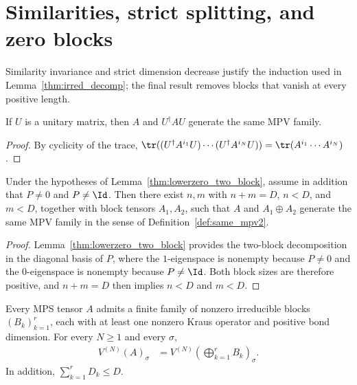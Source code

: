 \section{Similarities, strict splitting, and zero blocks}
\label{sec:app_canonical_splitting}

Similarity invariance and strict dimension decrease justify the induction used in Lemma~\ref{thm:irred_decomp}; the final result removes blocks that vanish at every positive length.

\begin{lemma}\label{thm:samempv_unitary}
    \leanok
    If $U$ is a unitary matrix, then $A$ and $U^\dagger A U$
    generate the same MPV family.
\end{lemma}

\begin{proof}\leanok
    By cyclicity of the trace,
    $\tr((U^\dagger A^{i_1} U) \cdots (U^\dagger A^{i_N} U))
        = \tr(A^{i_1} \cdots A^{i_N})$.
\end{proof}

\begin{lemma}
    \label{thm:lowerzero_two_block_strict}
    \leanok
    Under the hypotheses of Lemma~\ref{thm:lowerzero_two_block},
    assume in addition that $P\neq0$ and $P\neq\Id$.
    Then there exist $n,m$ with $n+m=D$, $n<D$, and $m<D$, together
    with block tensors $A_1,A_2$, such that
    $A$ and $A_1\oplus A_2$ generate the same MPV family in the sense of
    Definition~\ref{def:same_mpv2}.
\end{lemma}

\begin{proof}
    \leanok
    Lemma~\ref{thm:lowerzero_two_block} provides the two-block decomposition
    in the diagonal basis of $P$, where the $1$-eigenspace is nonempty because
    $P\neq0$ and the $0$-eigenspace is nonempty because $P\neq\Id$. Both block
    sizes are therefore positive, and $n+m=D$ then implies $n<D$ and $m<D$.
\end{proof}

\begin{lemma}%
    \label{thm:nonzero_irreducible_block_decomposition}
    \leanok
    Every MPS tensor $A$ admits a finite family of nonzero irreducible blocks
    $(B_k)_{k=1}^r$, each with at least one nonzero Kraus operator and positive
    bond dimension. For every $N\ge1$ and every $\sigma$,
    \begin{align}
        V^{(N)}(A)_\sigma
         & =
        V^{(N)}\!\left(\bigoplus_{k=1}^r B_k\right)_\sigma.
        \label{eq:canonical_nonzero_decomp}
    \end{align}
    In addition, $\sum_{k=1}^rD_k\le D$.
\end{lemma}

